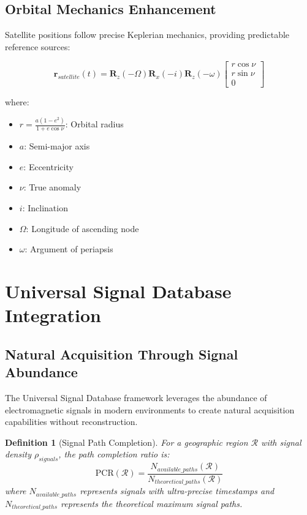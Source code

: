 \documentclass[12pt,a4paper]{article}
\newtheorem{definition}[theorem]{Definition}
\begin{document}
\subsection{Orbital Mechanics Enhancement}

Satellite positions follow precise Keplerian mechanics, providing predictable reference sources:

\begin{equation}
\mathbf{r}_{satellite}(t) = \mathbf{R}_z(-\Omega) \mathbf{R}_x(-i) \mathbf{R}_z(-\omega) \begin{bmatrix} r\cos\nu \\ r\sin\nu \\ 0 \end{bmatrix}
\end{equation}

where:
\begin{itemize}
\item $r = \frac{a(1-e^2)}{1+e\cos\nu}$: Orbital radius
\item $a$: Semi-major axis
\item $e$: Eccentricity  
\item $\nu$: True anomaly
\item $i$: Inclination
\item $\Omega$: Longitude of ascending node
\item $\omega$: Argument of periapsis
\end{itemize}

\section{Universal Signal Database Integration}

\subsection{Natural Acquisition Through Signal Abundance}

The Universal Signal Database framework leverages the abundance of electromagnetic signals in modern environments to create natural acquisition capabilities without reconstruction.

\begin{definition}[Signal Path Completion]
For a geographic region $\mathcal{R}$ with signal density $\rho_{signals}$, the path completion ratio is:
\begin{equation}
\text{PCR}(\mathcal{R}) = \frac{N_{available\_paths}(\mathcal{R})}{N_{theoretical\_paths}(\mathcal{R})}
\end{equation}
where $N_{available\_paths}$ represents signals with ultra-precise timestamps and $N_{theoretical\_paths}$ represents the theoretical maximum signal paths.
\end{definition}
\end{document}
